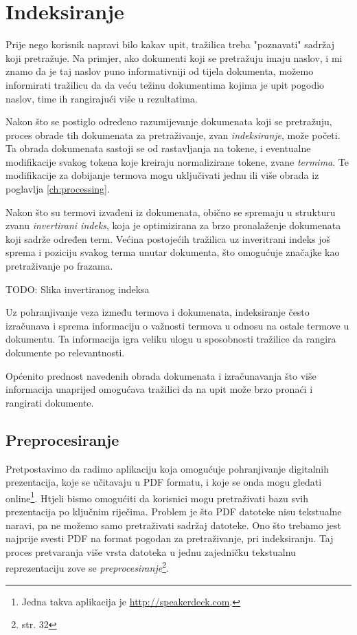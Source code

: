\documentclass[11pt]{scrreprt}
\begin{document}
\section{Indeksiranje}

Prije nego korisnik napravi bilo kakav upit, tražilica treba "poznavati" sadržaj koji pretražuje. Na primjer, ako dokumenti koji se pretražuju imaju naslov, i mi znamo da je taj naslov puno informativniji od tijela dokumenta, možemo informirati tražilicu da da veću težinu dokumentima kojima je upit pogodio naslov, time ih rangirajući više u rezultatima.

Nakon što se postiglo određeno razumijevanje dokumenata koji se pretražuju, proces obrade tih dokumenata za pretraživanje, zvan \textit{indeksiranje}, može početi. Ta obrada dokumenata sastoji se od rastavljanja na tokene, i eventualne modifikacije svakog tokena koje kreiraju normalizirane tokene, zvane \textit{termima}. Te modifikacije za dobijanje termova mogu uključivati jednu ili više obrada iz poglavlja \ref{ch:processing}.

Nakon što su termovi izvađeni iz dokumenata, obično se spremaju u strukturu zvanu \textit{invertirani indeks}, koja je optimizirana za brzo pronalaženje dokumenata koji sadrže određen term. Većina postojećih tražilica uz inveritrani indeks još sprema i poziciju svakog terma unutar dokumenta, što omogućuje značajke kao pretraživanje po frazama.

TODO: Slika invertiranog indeksa

Uz pohranjivanje veza između termova i dokumenata, indeksiranje često izračunava i sprema informaciju o važnosti termova u odnosu na ostale termove u dokumentu. Ta informacija igra veliku ulogu u sposobnosti tražilice da rangira dokumente po relevantnosti.

Općenito prednost navedenih obrada dokumenata i izračunavanja što više informacija unaprijed omogućava tražilici da na upit može brzo pronaći i rangirati dokumente.

\subsection{Preprocesiranje}

Pretpostavimo da radimo aplikaciju koja omogućuje pohranjivanje digitalnih prezentacija, koje se učitavaju u PDF formatu, i koje se onda mogu gledati online\footnote{Jedna takva aplikacija je \url{http://speakerdeck.com}.}. Htjeli bismo omogućiti da korisnici mogu pretraživati bazu svih prezentacija po ključnim riječima. Problem je što PDF datoteke nisu tekstualne naravi, pa ne možemo samo pretraživati sadržaj datoteke. Ono što trebamo jest najprije svesti PDF na format pogodan za pretraživanje, pri indeksiranju. Taj proces pretvaranja više vrsta datoteka u jednu zajedničku tekstualnu reprezentaciju zove se \textit{preprocesiranje}\footnote{\cite{taming} str. 32}.
\end{document}
